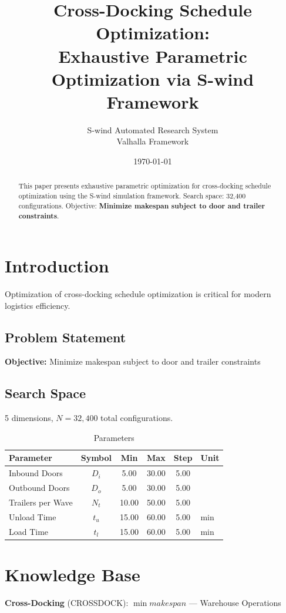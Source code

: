 \documentclass[11pt,twocolumn]{article}
\title{Cross-Docking Schedule Optimization: \\Exhaustive Parametric Optimization via S-wind Framework}
\author{S-wind Automated Research System\\Valhalla Framework}
\date{\today}
\begin{document}
\maketitle

\begin{abstract}
This paper presents exhaustive parametric optimization for cross-docking schedule optimization using the S-wind simulation framework.
Search space: 32,400 configurations. Objective: \textbf{Minimize makespan subject to door and trailer constraints}.
\end{abstract}

\section{Introduction}
Optimization of cross-docking schedule optimization is critical for modern logistics efficiency.

\subsection{Problem Statement}
\textbf{Objective:} Minimize makespan subject to door and trailer constraints

\subsection{Search Space}
5 dimensions, $N = 32,400$ total configurations.

\begin{table}[h]
\centering
\caption{Parameters}
\begin{tabular}{@{}lccccl@{}}
\toprule
Parameter & Symbol & Min & Max & Step & Unit \\
\midrule
Inbound Doors & $D_i$ & 5.00 & 30.00 & 5.00 &  \\
Outbound Doors & $D_o$ & 5.00 & 30.00 & 5.00 &  \\
Trailers per Wave & $N_t$ & 10.00 & 50.00 & 5.00 &  \\
Unload Time & $t_u$ & 15.00 & 60.00 & 5.00 & min \\
Load Time & $t_l$ & 15.00 & 60.00 & 5.00 & min \\
\bottomrule
\end{tabular}
\end{table}

\section{Knowledge Base}
\textbf{Cross-Docking} (CROSSDOCK): $\min makespan$ --- Warehouse Operations
\end{document}
